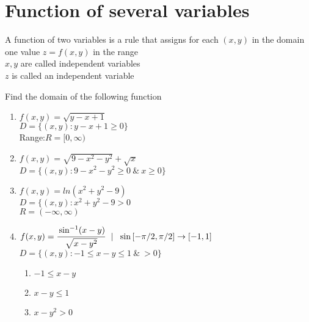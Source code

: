 \section{Function of several variables}
\begin{definition}
A function of two variables is a rule that assigns for each $(x,y)$ in the domain one value $z=f(x,y)$ in the range \\
$x,y$ are called independent variables\\
$z$ is called an independent variable
\end{definition} 
\begin{example}
Find the domain of the following function 
\begin{enumerate}
    \item $f(x,y)=\sqrt{y-x+1}$\\
    $D=\{(x,y):y-x+1\geq 0\}$\\
    Range:$R=[0,\infty)$
    \item $f(x,y)=\sqrt{9-x^2-y^2}+\sqrt{x}$\\
    $D=\{(x,y):9-x^2-y^2\geq 0~\&~x\geq0\}$
    \item $f(x,y)=ln(x^2+y^2-9)$\\
    $D=\{(x,y):x^2+y^2-9>0$\\
    $R=(-\infty,\infty)$
    \item $f(x,y)=\cfrac{\sin^{-1}(x-y)}{\sqrt{x-y^2}}~~|~~\sin{[-\pi/2,\pi/2]}\to [-1,1]$\\
    $D=\{(x,y):-1\leq x-y\leq 1 ~\&~>0\}$
    \begin{enumerate}
        \item $-1\leq x-y$
        \item $x-y\leq 1$
        \item $x-y^2>0$
    \end{enumerate}
\end{enumerate}
\end{example}